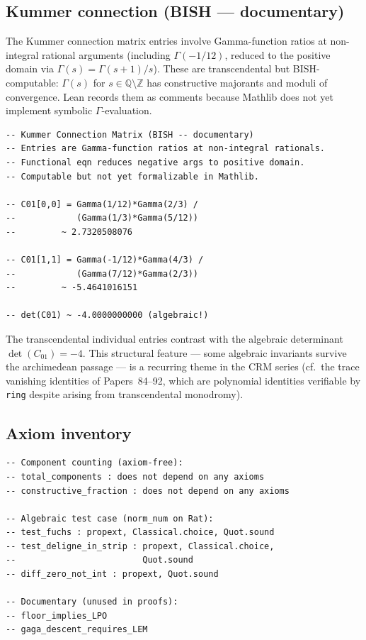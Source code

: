 \documentclass[11pt,a4paper]{article}
\theoremstyle{plain}
\theoremstyle{definition}
\newcommand{\BISH}{\textsf{BISH}}
\newcommand{\Z}{\mathbb{Z}}
\newcommand{\Q}{\mathbb{Q}}
\begin{document}
\subsection{Kummer connection (BISH --- documentary)}

The Kummer connection matrix entries involve Gamma-function ratios at non-integral rational arguments (including $\Gamma(-1/12)$, reduced to the positive domain via $\Gamma(s) = \Gamma(s{+}1)/s$).
These are transcendental but \BISH-computable: $\Gamma(s)$ for $s \in \Q \setminus \Z$ has constructive majorants and moduli of convergence.
Lean records them as comments because Mathlib does not yet implement symbolic $\Gamma$-evaluation.

\begin{tcolorbox}[leanbox={Kummer connection matrix -- documentary}]
\begin{lstlisting}[style=leanstyle]
-- Kummer Connection Matrix (BISH -- documentary)
-- Entries are Gamma-function ratios at non-integral rationals.
-- Functional eqn reduces negative args to positive domain.
-- Computable but not yet formalizable in Mathlib.

-- C01[0,0] = Gamma(1/12)*Gamma(2/3) /
--            (Gamma(1/3)*Gamma(5/12))
--         ~ 2.7320508076

-- C01[1,1] = Gamma(-1/12)*Gamma(4/3) /
--            (Gamma(7/12)*Gamma(2/3))
--         ~ -5.4641016151

-- det(C01) ~ -4.0000000000 (algebraic!)
\end{lstlisting}
\end{tcolorbox}

The transcendental individual entries contrast with the algebraic determinant $\det(C_{01}) = -4$.
This structural feature --- some algebraic invariants survive the archimedean passage --- is a recurring theme in the CRM series (cf.\ the trace vanishing identities of Papers~84--92, which are polynomial identities verifiable by \texttt{ring} despite arising from transcendental monodromy).

\subsection{Axiom inventory}

\begin{tcolorbox}[leanbox={\texttt{\#print axioms} output}]
\begin{lstlisting}[style=leanstyle]
-- Component counting (axiom-free):
-- total_components : does not depend on any axioms
-- constructive_fraction : does not depend on any axioms

-- Algebraic test case (norm_num on Rat):
-- test_fuchs : propext, Classical.choice, Quot.sound
-- test_deligne_in_strip : propext, Classical.choice,
--                         Quot.sound
-- diff_zero_not_int : propext, Quot.sound

-- Documentary (unused in proofs):
-- floor_implies_LPO
-- gaga_descent_requires_LEM
\end{lstlisting}
\end{tcolorbox}
\end{document}
